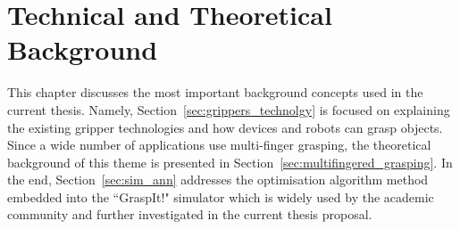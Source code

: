 \chapter{Technical and Theoretical Background}
\label{cap2a:background}
This chapter discusses the most important background concepts used in the current thesis. Namely, Section~\ref{sec:grippers_technolgy} is focused on explaining the existing gripper technologies and how devices and robots can grasp objects. Since a wide number of applications use multi-finger grasping, the theoretical background of this theme is presented in Section~\ref{sec:multifingered_grasping}. In the end, Section~\ref{sec:sim_ann} addresses the optimisation algorithm method embedded into the ``GraspIt!" simulator which is widely used by the academic community and further investigated in the current thesis proposal.  




